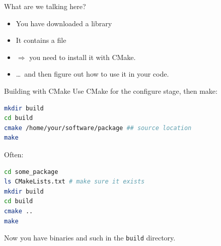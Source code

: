 
\lstset{language=bash}


\begin{numberedframe}{What are we talking here?}
  \begin{itemize}
  \item You have downloaded a library
  \item It contains a file 
  \item $\Rightarrow$ you need to install it with CMake.
  \item \ldots~and then figure out how to use it in your code.
  \end{itemize}
\end{numberedframe}

\begin{numberedframe}{Building with CMake}
 Use CMake for the configure stage, then make:
\begin{lstlisting}[language=bash]
mkdir build
cd build
cmake /home/your/software/package ## source location
make
\end{lstlisting}
Often:
\begin{lstlisting}[language=bash]
cd some_package
ls CMakeLists.txt # make sure it exists
mkdir build
cd build
cmake ..
make
\end{lstlisting}
Now you have binaries and such in the \lstinline{build} directory.
\end{numberedframe}

